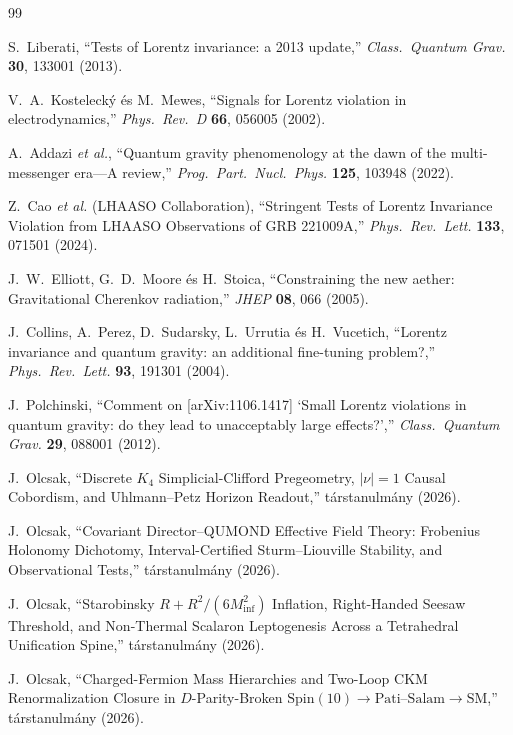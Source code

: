 \documentclass[11pt,a4paper]{article}
\begin{document}
\begin{thebibliography}{99}
\raggedright
\small

S.~Liberati, ``Tests of Lorentz invariance: a 2013 update,'' \emph{Class.\ Quantum Grav.} \textbf{30}, 133001 (2013).

V.~A.~Kosteleck\'y és M.~Mewes, ``Signals for Lorentz violation in electrodynamics,'' \emph{Phys.\ Rev.\ D} \textbf{66}, 056005 (2002).

A.~Addazi \emph{et al.}, ``Quantum gravity phenomenology at the dawn of the multi-messenger era---A review,'' \emph{Prog.\ Part.\ Nucl.\ Phys.} \textbf{125}, 103948 (2022).

Z.~Cao \emph{et al.} (LHAASO Collaboration), ``Stringent Tests of Lorentz Invariance Violation from LHAASO Observations of GRB 221009A,'' \emph{Phys.\ Rev.\ Lett.} \textbf{133}, 071501 (2024).

J.~W.~Elliott, G.~D.~Moore és H.~Stoica, ``Constraining the new aether: Gravitational Cherenkov radiation,'' \emph{JHEP} \textbf{08}, 066 (2005).

J.~Collins, A.~Perez, D.~Sudarsky, L.~Urrutia és H.~Vucetich, ``Lorentz invariance and quantum gravity: an additional fine-tuning problem?,'' \emph{Phys.\ Rev.\ Lett.} \textbf{93}, 191301 (2004).

J.~Polchinski, ``Comment on [arXiv:1106.1417] `Small Lorentz violations in quantum gravity: do they lead to unacceptably large effects?','' \emph{Class.\ Quantum Grav.} \textbf{29}, 088001 (2012).

J.~Olcsak, ``Discrete $K_4$ Simplicial-Clifford Pregeometry, $|\nu|=1$ Causal Cobordism, and Uhlmann--Petz Horizon Readout,'' társtanulmány (2026).

J.~Olcsak, ``Covariant Director--QUMOND Effective Field Theory: Frobenius Holonomy Dichotomy, Interval-Certified Sturm--Liouville Stability, and Observational Tests,'' társtanulmány (2026).

J.~Olcsak, ``Starobinsky $R + R^2/(6 M_{\mathrm{inf}}^2)$ Inflation, Right-Handed Seesaw Threshold, and Non-Thermal Scalaron Leptogenesis Across a Tetrahedral Unification Spine,'' társtanulmány (2026).

J.~Olcsak, ``Charged-Fermion Mass Hierarchies and Two-Loop CKM Renormalization Closure in $D$-Parity-Broken $\mathrm{Spin}(10) \to \mathrm{Pati\text{--}Salam} \to \mathrm{SM}$,'' társtanulmány (2026).


\end{thebibliography}
\end{document}
